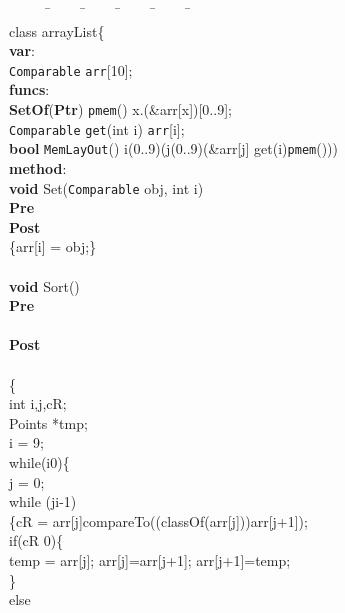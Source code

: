 \documentclass[fleqn]{llncs}
\begin{document}
\begin{figure}
\begin{boxedminipage}{0.9\textwidth}
{\scriptsize
\begin{tabbing}
\mbox{}\ \ \ \ \ \=\ \ \ \ \ \=\ \ \ \ \ \=\ \ \ \ \ \=\ \ \ \ \ \=\ \ \ \ \ \=\\
class arrayList\{\\
\textbf{var}:\\
    \>\texttt{Comparable} \verb"arr"[10];\\
\textbf{funcs}:\\
    \>\textbf{SetOf}(\textbf{Ptr}) \texttt{pmem}()  x.(\&arr[x])[0..9];\\
    \>\texttt{Comparable} \texttt{get}(int i)  \verb"arr"[i];\\
    \>\textbf{bool} \texttt{MemLayOut}()  i(0..9)(j(0..9)(\&arr[j]  get(i){\fldacc}\texttt{pmem}()))\\
\textbf{method}:\\
    \>\textbf{void} Set(\texttt{Comparable} obj, int i)\\
    \>  \>\textbf{Pre} \>\>\\
    \>  \>\textbf{Post} \>\>\\
    \>  \>\{arr[i] = obj;\}\\
    \\
    \>\textbf{void} Sort()\\
    \>  \>\textbf{Pre} \>\>\\
    \>  \>              \>\>\\
    \>  \>\textbf{Post}\>\>\\
    \>  \>              \>\>\\
\>     \> \{\\
\>     \>  \>int i,j,cR;\\
\>     \>  \>Points *tmp;\\
\>     \>  \>i = 9;\\
\>     \>  \>while(i0)\{\\
\>     \>  \>    \>j = 0;\\
\>     \>  \>    \>while (ji-1)\\
\>     \>  \>    \>\{\>cR = arr[j]compareTo((classOf(arr[j]))arr[j+1]);\\
\>     \>  \>    \>  \>if(cR  0)\{\\
\>     \>  \>    \>  \>  \>temp = arr[j];  arr[j]=arr[j+1];  arr[j+1]=temp;\\
\>     \>  \>    \>  \>\}\\
\>     \>  \>    \>  \>else\\

\end{tabbing}}
\end{boxedminipage}
\end{figure}
\end{document}
